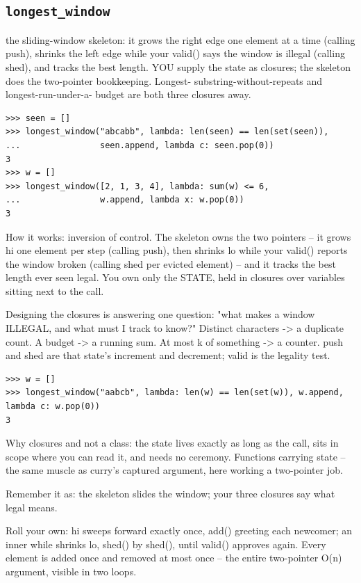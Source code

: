 \documentclass[10pt,letterpaper]{book}
\begin{document}
\subsection{\texttt{longest\_window}}\label{def:longest-window}
the sliding-window skeleton: it grows the right edge one element at a time (calling push), shrinks the left edge while your valid() says the window is illegal (calling shed), and tracks the best length. YOU supply the state as closures; the skeleton does the two-pointer bookkeeping. Longest- substring-without-repeats and longest-run-under-a- budget are both three closures away.
\begin{lstlisting}[style=ex]
>>> seen = []
>>> longest_window("abcabb", lambda: len(seen) == len(set(seen)),
...                seen.append, lambda c: seen.pop(0))
3
>>> w = []
>>> longest_window([2, 1, 3, 4], lambda: sum(w) <= 6,
...                w.append, lambda x: w.pop(0))
3
\end{lstlisting}

How it works: inversion of control. The skeleton owns the two pointers -- it grows hi one element per step (calling push), then shrinks lo while your valid() reports the window broken (calling shed per evicted element) -- and it tracks the best length ever seen legal. You own only the STATE, held in closures over variables sitting next to the call.


Designing the closures is answering one question: "what makes a window ILLEGAL, and what must I track to know?" Distinct characters -> a duplicate count. A budget -> a running sum. At most k of something -> a counter. push and shed are that state's increment and decrement; valid is the legality test.

\begin{lstlisting}[style=ex]
>>> w = []
>>> longest_window("aabcb", lambda: len(w) == len(set(w)), w.append, lambda c: w.pop(0))
3
\end{lstlisting}

Why closures and not a class: the state lives exactly as long as the call, sits in scope where you can read it, and needs no ceremony. Functions carrying state -- the same muscle as curry's captured argument, here working a two-pointer job.


Remember it as: the skeleton slides the window; your three closures say what legal means.


Roll your own: hi sweeps forward exactly once, add() greeting each newcomer; an inner while shrinks lo, shed() by shed(), until valid() approves again. Every element is added once and removed at most once -- the entire two-pointer O(n) argument, visible in two loops.
\end{document}

